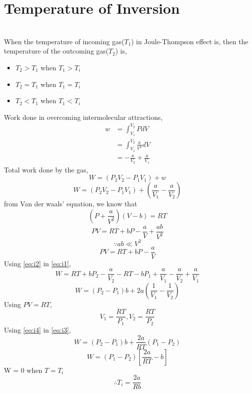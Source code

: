 \documentclass{article}
\numberwithin{equation}{section}
\begin{document}
\section{Temperature of Inversion}
\\
When the temperature of incoming gas($T_1$) in Joule-Thompson effect is, then the temperature of the outcoming gas($T_2$) is,
\begin{itemize}
\item $T_2 > T_1$ when $T_1 > T_i$
\item $T_2 = T_1$ when $T_1 = T_i$
\item $T_2 < T_1$ when $T_1 < T_i$
\end{itemize}
Work done in overcoming intermolecular attractions,
\begin{align*}
  w &= \int_{V_1}^{V_2} P dV\\
  &= \int_{V_1}^{V_2} \frac{a}{V^2} dV\\
  &= - \frac{a}{V_2} + \frac{a}{V_1}
\end{align*}
Total work done by the gas,
$$W = (P_2 V_2 - P_1 V_1) + w$$
\begin{equation}
  W = (P_2 V_2 - P_1 V_1) + \left(\frac{a}{V_1} - \frac{a}{V_2}\right) \label{eq:i1}
\end{equation}
from Van der waals' equation, we know that
$$\left(P+\frac{a}{V^2}\right)(V-b) = RT$$
$$PV = RT + bP - \frac{a}{V} + \frac{ab}{V^2}$$
$$\because ab \ll V^2$$
\begin{equation}
  PV = RT + bP - \frac{a}{V} \label{eq:i2}
\end{equation}
Using \eqref{eq:i2} in \eqref{eq:i1},
$$W = RT + bP_2 - \frac{a}{V_2} - RT - bP_1 + \frac{a}{V_1} - \frac{a}{V_2} + \frac{a}{V_1}$$
\begin{equation}
  W = (P_2 - P_1)b + 2a \left(\frac{1}{V_1} - \frac{1}{V_2}\right) \label{eq:i3}
\end{equation}
Using $PV=RT$,
\begin{equation}
  V_1 = \frac{RT}{P_1} , V_2 = \frac{RT}{P_2} \label{eq:i4}
\end{equation}
Using \eqref{eq:i4} in \eqref{eq:i3},
$$W = (P_2 - P_1)b + \frac{2a}{RT}(P_1 - P_2)$$
$$W = (P_1 - P_2) \left[ \frac{2a}{RT} - b \right]$$
W = 0 when $T=T_i$\\
\[ \therefore \boxed{T_i = \frac{2a}{Rb}} \label{eq:i5} \tag{3.5} \]
\end{document}
